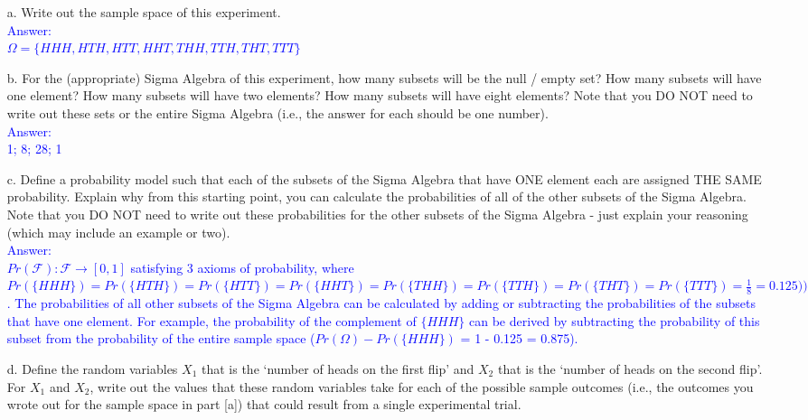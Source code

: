 \documentclass[letterpaper, 11pt]{article}
\begin{document}
\begin{itemize}

\item[a.] Write out the sample space of this experiment. \\

\textcolor{blue}{Answer: \\
$\Omega = \{HHH, HTH, HTT, HHT, THH, TTH, THT, TTT\}$} \\


\item[b.] For the (appropriate) Sigma Algebra of this experiment, how many subsets will be the null / empty set?  How many subsets will have one element?  How many subsets will have two elements?  How many subsets will have eight elements?   Note that you DO NOT need to write out these sets or the entire Sigma Algebra (i.e., the answer for each should be one number). \\

\textcolor{blue}{Answer:\\
1; 8; 28; 1}\\


\item[c.] Define a probability model such that each of the subsets of the Sigma Algebra that have ONE element each are assigned THE SAME probability.  Explain why from this starting point, you can calculate the probabilities of all of the other subsets of the Sigma Algebra.  Note that you DO NOT need to write out these probabilities for the other subsets of the Sigma Algebra - just explain your reasoning (which may include an example or two).\\

\textcolor{blue}{Answer:\\
$Pr(\mathcal{F}): \mathcal{F} \rightarrow [0, 1]$ satisfying 3 axioms of probability, where $Pr(\{HHH\}) = Pr(\{HTH\}) = Pr(\{HTT\}) = Pr(\{HHT\}) = Pr(\{THH\}) = Pr(\{TTH\}) = Pr(\{THT\}) = Pr(\{TTT\}) = \frac{1}{8} = 0.125))$. The probabilities of all other subsets of the Sigma Algebra can be calculated by adding or subtracting the probabilities of the subsets that have one element. For example, the probability of the complement of $\{HHH\}$ can be derived by subtracting the probability of this subset from the probability of the entire sample space ($Pr(\Omega) - Pr(\{HHH\})$ = 1 - 0.125 = 0.875).}\\


\item[d.] Define the random variables $X_1$ that is the `number of heads on the first flip' and $X_2$ that is the `number of heads on the second flip'.  For $X_1$ and $X_2$, write out the values that these random variables take for each of the possible sample outcomes (i.e., the outcomes you wrote out for the sample space in part [a]) that could result from a single experimental trial.\\


\end{itemize}
\end{document}
